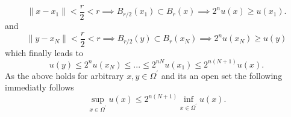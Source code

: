 \documentclass[A4,12pt,twoside]{book}
\begin{document}
{    \[
    \| x - x_1 \| < \frac{r}{2} < r \implies B_{r/2} (x_1) \subset B_r (x) \implies 2^n u(x) \geq u(x_1).
    \]
    and
    \[
    \| y - x_N \| < \frac{r}{2} < r \implies B_{r/2} (y) \subset B_r (x_N) \implies 2^n u (x_N) \geq u(y)
    \]
    which finally leads to 
    \[
    u(y) \leq 2^n u(x_N) \leq ... \leq 2^{nN} u(x_1) \leq 2^{n(N+1)} u(x).
    \]
    As the above holds for arbitrary $x,y \in \Omega^\prime$ and its an open set the following immediatly follows
    \[
    \sup_{x \in \Omega^\prime } u(x) \leq 2^{n(N+1)} \inf_{x \in \Omega^\prime} u(x).
    \]

}

\end{document}
